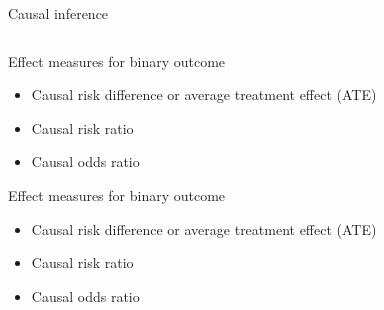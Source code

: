 \documentclass[12pt,aspectratio=169]{beamer}
\begin{document}
\begin{frame}{Causal inference}
\begin{columns}
\begin{column}{0.43\textwidth}
\begin{center}
     \end{center}
\end{column}
\end{columns}
 
\end{frame}


\begin{frame}{Effect measures for binary outcome}
 	\begin{itemize}
 
  
 \item 
 Causal risk difference or average treatment effect (ATE)

\item Causal risk ratio
\item Causal  odds ratio


\end{itemize}

\end{frame}


\begin{frame}{Effect measures for binary outcome}
 	\begin{itemize}
 
  
 \item 
 \colorbox{blue!10}{Causal risk difference or average treatment effect (ATE)}

\item Causal risk ratio
\item Causal  odds ratio


\end{itemize}

\end{frame}
\end{document}
